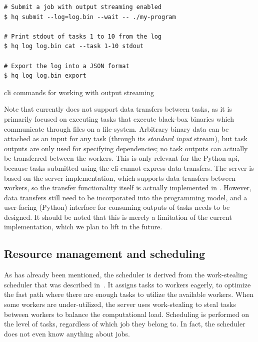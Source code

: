 \begin{listing}[h]
	\begin{verbatim}
# Submit a job with output streaming enabled
$ hq submit --log=log.bin --wait -- ./my-program

# Print stdout of tasks 1 to 10 from the log
$ hq log log.bin cat --task 1-10 stdout

# Export the log into a JSON format
$ hq log log.bin export
	\end{verbatim}
	\caption{\hyperqueue{} \acrshort{cli} commands for working with output streaming}
	\label{lst:hq-cli-log}
\end{listing}

Note that \hyperqueue{} currently does not support data transfers between tasks, as it is
primarily focused on executing tasks that execute black-box binaries which communicate through
files on a file-system. Arbitrary binary data can be attached as an input for any task (through its
\emph{standard input} stream), but task outputs are only used for specifying dependencies; no
task outputs can actually be transferred between the workers. This is only relevant for the Python
\gls{api}, because tasks submitted using the \gls{cli} cannot express
data transfers. The \hq{} server is based on the \rsds{} server
implementation, which supports data transfers between workers, so the transfer functionality itself
is actually implemented in \hq{}. However, data transfers still need to be
incorporated into the \hyperqueue{} programming model, and a user-facing (Python)
interface for consuming outputs of tasks needs to be designed. It should be noted that this is
merely a limitation of the current implementation, which we plan to lift in the future.

\subsection{Resource management and scheduling}
\label{sec:hq-resource-management}
As has already been mentioned, the \hyperqueue{} scheduler is derived from the
\rsds{} work-stealing scheduler that was described in~. It
assigns tasks to workers eagerly, to optimize the fast path where there are enough tasks to utilize
the available workers. When some workers are under-utilized, the server uses work-stealing to steal
tasks between workers to balance the computational load. Scheduling is performed on the level of
tasks, regardless of which job they belong to. In fact, the scheduler does not even know anything
about jobs.

